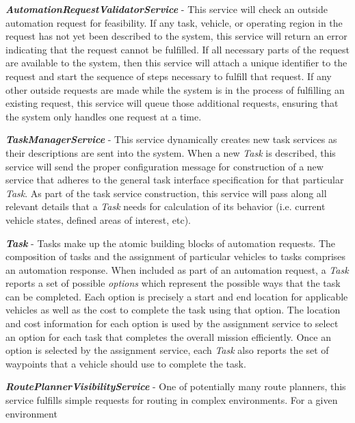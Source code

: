 \begin{description}
\item
  \textbf{\textit{AutomationRequestValidatorService}} - This service will check an outside
  automation request for feasibility. If any task, vehicle, or operating region in the request
  has not yet been described to the system, this service will return an error indicating that
  the request cannot be fulfilled. If all necessary parts of the request are available to the
  system, then this service will attach a unique identifier to the request and start the
  sequence of steps necessary to fulfill that request. If any other outside requests are made
  while the system is in the process of fulfilling an existing request, this service will queue
  those additional requests, ensuring that the system only handles one request at a time. 
\item
  \textbf{\textit{TaskManagerService}} - This service dynamically creates new task services as
  their descriptions are sent into the system. When a new \textit{Task} is described, this service
  will send the proper configuration message for construction of a new service that adheres to
  the general task interface specification for that particular \textit{Task}. As part of the task
  service construction, this service will pass along all relevant details that a \textit{Task}
  needs for calculation of its behavior (i.e. current vehicle states, defined areas of interest, etc).
\item
  \textbf{\textit{Task}} - Tasks make up the atomic building blocks of automation requests. The
  composition of tasks and the assignment of particular vehicles to tasks comprises an automation
  response. When included as part of an automation request, a \textit{Task} reports a set of
  possible \emph{options} which represent the possible ways that the task can be completed. Each
  option is precisely a start and end location for applicable vehicles as well as the cost to
  complete the task using that option. The location and cost information for each option is used
  by the assignment service to select an option for each task that completes the overall mission
  efficiently. Once an option is selected by the assignment service, each \textit{Task} also
  reports the set of waypoints that a vehicle should use to complete the task.
\item
  \textbf{\textit{RoutePlannerVisibilityService}} - One of potentially many route planners, this
  service fulfills simple requests for routing in complex environments. For a given environment

\end{description}
